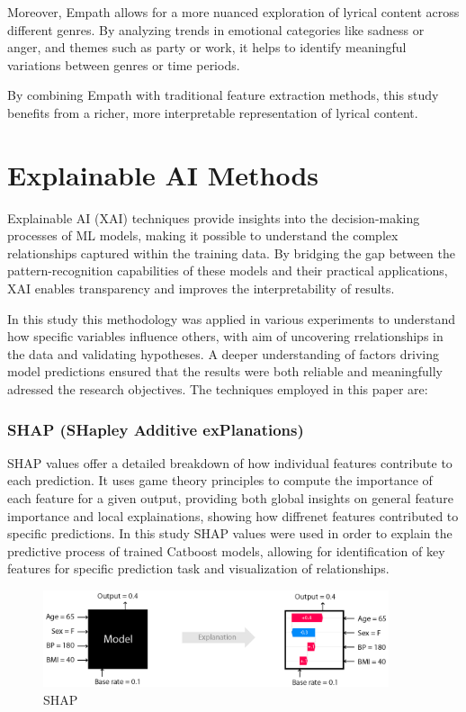 Moreover, Empath allows for a more nuanced exploration of lyrical content
across different genres. By analyzing trends in emotional categories like
sadness or anger, and themes such as party or work, it helps to identify
meaningful variations between genres or time periods.

By combining Empath with traditional feature extraction methods, this study
benefits from a richer, more interpretable representation of lyrical content.



\section{Explainable AI Methods}
\label{sec:explainableaimethods}


Explainable AI (XAI) techniques provide insights into the decision-making
processes of ML models, making it possible to understand the complex
relationships captured within the training data. By bridging the gap between
the pattern-recognition capabilities of these models and their practical
applications, XAI enables transparency and improves the interpretability of
results.

In this study this methodology was applied in various experiments to understand
how specific variables influence others, with aim of uncovering rrelationships
in the data and validating hypotheses. A deeper  understanding of factors
driving model predictions ensured that the results were both reliable and
meaningfully adressed the research objectives. The  techniques employed in this paper are: 

\subsubsection*{SHAP (SHapley Additive exPlanations)}
SHAP\cite{shap} values offer a detailed  breakdown of how individual features contribute
to  each prediction. It uses game theory principles to compute the importance
of each feature for a given output, providing both global insights on general
feature importance and  local explainations, showing how diffrenet features
contributed to specific predictions. In this study SHAP values were used in
order to explain the predictive process of trained Catboost models, allowing
for identification of key features for specific prediction task and
visualization of relationships.

\begin{center}
\begin{figure}[ht]
  \centering
  \includegraphics[width=4in]{img/shap_intro.png}
  \caption{SHAP\cite{shap}}
  \label{Figure:fig_beh}
\end{figure}
\end{center}

